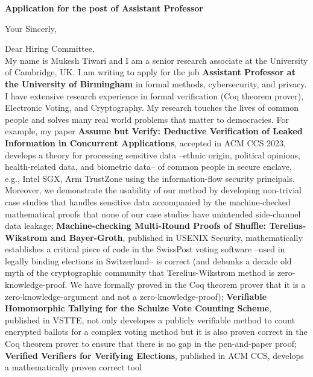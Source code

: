 \documentclass[11pt,a4paper,roman]{moderncv}
\begin{document}
\date{}
\opening{\textbf{Application for the post of Assistant Professor}}
\closing{Your Sincerly, \vspace{-1em}}



\makelettertitle


Dear Hiring Committee, 
\\
\vspace{1em}
My name is Mukesh Tiwari and I am a senior research associate at 
the University of Cambridge, UK. I am writing to apply
for the job \textbf{Assistant Professor at the University of Birmingham} in 
formal methods, cybersecurity, and privacy. I have extensive research experience in
formal verification (Coq theorem prover), Electronic Voting, and Cryptography.
My research touches the lives of common people and solves 
many real world problems that matter to democracies. For example, my paper
\textbf{Assume but Verify: Deductive Verification of Leaked Information in Concurrent Applications},
accepted in ACM CCS 2023, develops a theory for processing sensitive data --ethnic origin, political opinions,
health-related data, and  biometric data-- of common 
people in secure enclave, e.g., Intel SGX, Arm TrustZone using the information-flow security principals. Moreover, 
we demonstrate the usability of our method by developing non-trivial case studies that handles 
sensitive data accompanied by the machine-checked mathematical proofs that none of our case studies have unintended side-channel 
data leakage; 
\textbf{Machine-checking Multi-Round Proofs of Shuffle: Terelius-Wikstrom and Bayer-Groth}, 
published in USENIX Security, mathematically establishes a critical piece of 
code in the SwissPost voting software --used in legally binding 
elections in Switzerland-- is correct (and debunks a decade old myth of the cryptographic 
community that Terelius-Wikstrom method is zero-knowledge-proof. We have formally 
proved in the Coq theorem prover that it is a zero-knowledge-argument and not 
a zero-knowledge-proof);
\textbf{Verifiable Homomorphic Tallying for the Schulze Vote Counting Scheme}, published 
in VSTTE, not only developes a publicly verifiable method to count encrypted ballots for a complex voting method but it 
is also proven correct in the Coq theorem prover to ensure that there is no gap in 
the pen-and-paper proof; 
\textbf{Verified Verifiers for 
Verifying Elections}, published in ACM CCS, develops a mathematically proven correct tool 
\end{document}
